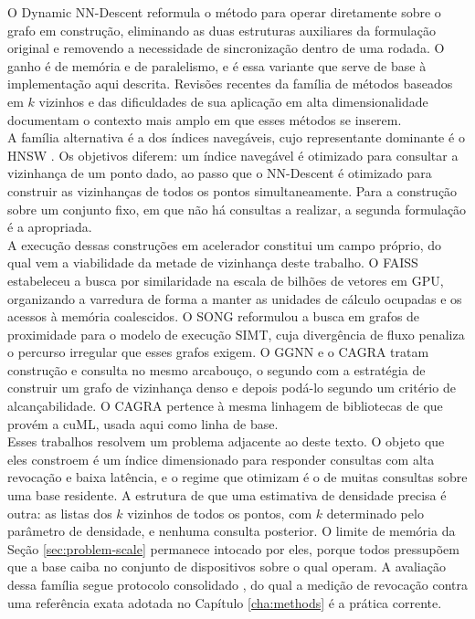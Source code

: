 O Dynamic NN-Descent \cite{dynamic_nndescent} reformula o método para operar diretamente sobre o grafo em construção, eliminando as duas estruturas auxiliares da formulação original e removendo a necessidade de sincronização dentro de uma rodada. O ganho é de memória e de paralelismo, e é essa variante que serve de base à implementação aqui descrita. Revisões recentes da família de métodos baseados em $k$ vizinhos \cite{knn-review} e das dificuldades de sua aplicação em alta dimensionalidade \cite{knn-challenges} documentam o contexto mais amplo em que esses métodos se inserem.\\

A família alternativa é a dos índices navegáveis, cujo representante dominante é o \ac{HNSW} \cite{hnsw}. Os objetivos diferem: um índice navegável é otimizado para consultar a vizinhança de um ponto dado, ao passo que o NN-Descent é otimizado para construir as vizinhanças de todos os pontos simultaneamente. Para a construção sobre um conjunto fixo, em que não há consultas a realizar, a segunda formulação é a apropriada.\\

A execução dessas construções em acelerador constitui um campo próprio, do qual vem a viabilidade da metade de vizinhança deste trabalho. O FAISS \cite{faiss-gpu} estabeleceu a busca por similaridade na escala de bilhões de vetores em \ac{GPU}, organizando a varredura de forma a manter as unidades de cálculo ocupadas e os acessos à memória coalescidos. O SONG \cite{song} reformulou a busca em grafos de proximidade para o modelo de execução \ac{SIMT}, cuja divergência de fluxo penaliza o percurso irregular que esses grafos exigem. O GGNN \cite{ggnn} e o CAGRA \cite{cagra} tratam construção e consulta no mesmo arcabouço, o segundo com a estratégia de construir um grafo de vizinhança denso e depois podá-lo segundo um critério de alcançabilidade. O CAGRA pertence à mesma linhagem de bibliotecas de que provém a cuML, usada aqui como linha de base.\\

Esses trabalhos resolvem um problema adjacente ao deste texto. O objeto que eles constroem é um índice dimensionado para responder consultas com alta revocação e baixa latência, e o regime que otimizam é o de muitas consultas sobre uma base residente. A estrutura de que uma estimativa de densidade precisa é outra: as listas dos $k$ vizinhos de todos os pontos, com $k$ determinado pelo parâmetro de densidade, e nenhuma consulta posterior. O limite de memória da Seção \ref{sec:problem-scale} permanece intocado por eles, porque todos pressupõem que a base caiba no conjunto de dispositivos sobre o qual operam. A avaliação dessa família segue protocolo consolidado \cite{annbench}, do qual a medição de revocação contra uma referência exata adotada no Capítulo \ref{cha:methods} é a prática corrente.\\

